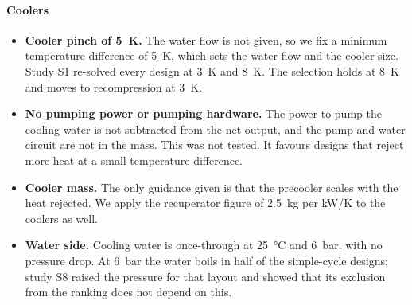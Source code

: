 \paragraph{Coolers}
\begin{itemize}
  \item \textbf{Cooler pinch of \SI{5}{K}.} The water flow is not given, so we fix a minimum temperature difference of \SI{5}{K}, which sets the water flow and the cooler size. Study S1 re-solved every design at \SI{3}{K} and \SI{8}{K}. The selection holds at \SI{8}{K} and moves to recompression at \SI{3}{K}.
  \item \textbf{No pumping power or pumping hardware.} The power to pump the cooling water is not subtracted from the net output, and the pump and water circuit are not in the mass. This was not tested. It favours designs that reject more heat at a small temperature difference.
  \item \textbf{Cooler mass.} The only guidance given is that the precooler scales with the heat rejected. We apply the recuperator figure of \SI{2.5}{kg} per \si{kW/K} to the coolers as well.
  \item \textbf{Water side.} Cooling water is once-through at \SI{25}{\celsius} and \SI{6}{bar}, with no pressure drop. At \SI{6}{bar} the water boils in half of the simple-cycle designs; study S8 raised the pressure for that layout and showed that its exclusion from the ranking does not depend on this.
\end{itemize}

